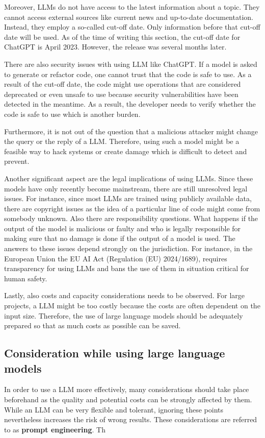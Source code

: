 Moreover, \ac{LLM}s do not have access to the latest information about a topic. They cannot access external sources like current news and up-to-date documentation. Instead, they employ a so-called cut-off date. Only information before that cut-off date will be used. As of the time of writing this section, the cut-off date for ChatGPT is April  2023. However, the release was several months later.  

There are also security issues with using  \ac{LLM} like ChatGPT. If a model is asked to generate or refactor code, one cannot trust that the code is safe to use. As a result of the cut-off date, the code might use operations that are considered deprecated or even unsafe to use because security vulnerabilities have been detected in the meantime. As a result, the developer needs to verify whether the code is safe to use which is another burden.  \cite{pearce2021asleep}

Furthermore, it is not out of the question that a malicious attacker might change the query or the reply of a \ac{LLM}. Therefore, using such a model might be a feasible way to hack systems or create damage which is difficult to detect and prevent. \cite{not_what_you_signed_for}

Another significant aspect are the legal implications of using \acp{LLM}. Since these models have only recently become mainstream, there are still unresolved legal issues. For instance, since most \acp{LLM} are trained using publicly available data, there are copyright issues as the idea of a particular line of code might come from somebody unknown. Also there are responsibility questions. What happens if the output of the model is malicious or faulty and who is legally responsible for making sure that no damage is done if the output of a model is used. The answers to these issues depend strongly on the jurisdiction. For instance, in the European Union the EU AI Act (Regulation (EU) 2024/1689), requires  transparency for using \acp{LLM} and bans the use of them in situation critical for human safety.  \cite{eu-ai-act}


Lastly, also costs and capacity considerations needs to be observed. For large projects, a \ac{LLM} might be too costly because  the costs are often dependent on the input size. Therefore, the use of large language models should be adequately prepared so that as much costs as possible can be saved.  \cite{chen2023frugalgpt}




\subsection{Consideration while using large language models}
In order to use a \ac{LLM} more effectively, many considerations should take place beforehand as the quality and potential costs can be strongly affected by them. While an \ac{LLM} can be very flexible and tolerant, ignoring these points nevertheless increases the risk of wrong results. These considerations are  referred to as \textbf{prompt engineering}. Th

